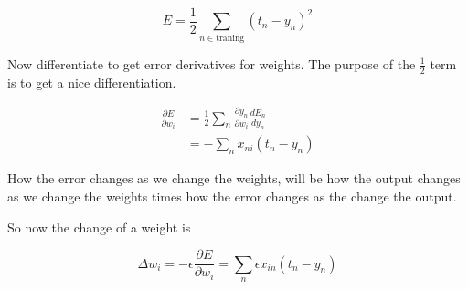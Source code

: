 \documentclass{article}
\begin{document}
\[
    E=\frac{1}{2} \sum_{n\in \text{traning}} (t_n - y_n)^2
\]

Now differentiate to get error derivatives for weights. The purpose of the \(\frac{1}{2}\) term is to get a nice differentiation.

\begin{align*}
    \frac{\partial E}{\partial w_i}&=
    \frac{1}{2} \sum_n \frac{\partial y_n}{\partial w_i} \frac{dE_n}{dy_n} \\
    &= - \sum_n x_{ni} (t_n-y_n)
\end{align*}

How the error changes as we change the weights, will be how the output changes as we change the weights
times how the error changes as the change the output.

So now the change of a weight is

\[
    \Delta w_i=-\epsilon \frac{\partial E}{\partial w_i} = \sum_n \epsilon x_{in}(t_n-y_n)
\]
\end{document}

